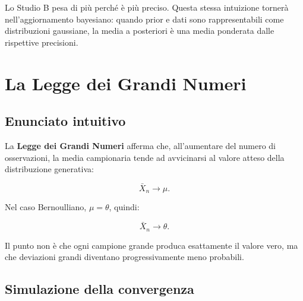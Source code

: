 \documentclass[
  italian,
  letterpaper,
  a4paper,
  11pt,
  open=any]{scrbook}
\theoremstyle{plain}
\theoremstyle{definition}
\theoremstyle{definition}
\theoremstyle{remark}
\begin{document}
Lo Studio B pesa di più perché è più preciso. Questa stessa intuizione
tornerà nell'aggiornamento bayesiano: quando prior e dati sono
rappresentabili come distribuzioni gaussiane, la media a posteriori è
una media ponderata dalle rispettive precisioni.

\section{La Legge dei Grandi Numeri}\label{sec-lln-evidence}

\subsection{Enunciato intuitivo}\label{enunciato-intuitivo}

La \textbf{Legge dei Grandi Numeri} afferma che, all'aumentare del
numero di osservazioni, la media campionaria tende ad avvicinarsi al
valore atteso della distribuzione generativa:

\[
\bar{X}_n \longrightarrow \mu.
\]

Nel caso Bernoulliano, \(\mu=\theta\), quindi:

\[
\bar{X}_n \longrightarrow \theta.
\]

Il punto non è che ogni campione grande produca esattamente il valore
vero, ma che deviazioni grandi diventano progressivamente meno
probabili.

\subsection{Simulazione della
convergenza}\label{simulazione-della-convergenza}
\end{document}
